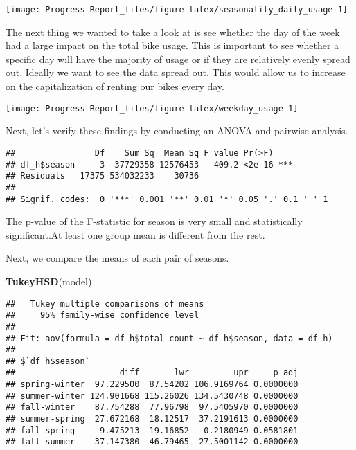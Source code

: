 \documentclass[
  11pt,
]{article}
\newenvironment{Shaded}{\begin{snugshade}}{\end{snugshade}}
\newcommand{\AttributeTok}[1]{\textcolor[rgb]{0.13,0.29,0.53}{#1}}
\newcommand{\FunctionTok}[1]{\textcolor[rgb]{0.13,0.29,0.53}{\textbf{#1}}}
\newcommand{\NormalTok}[1]{#1}
\newcommand{\OtherTok}[1]{\textcolor[rgb]{0.56,0.35,0.01}{#1}}
\newcommand{\SpecialCharTok}[1]{\textcolor[rgb]{0.81,0.36,0.00}{\textbf{#1}}}
\begin{document}
\begin{center}\texttt{[image: Progress-Report\_files/figure-latex/seasonality\_daily\_usage-1]} \end{center}

The next thing we wanted to take a look at is see whether the day of the
week had a large impact on the total bike usage. This is important to
see whether a specific day will have the majority of usage or if they
are relatively evenly spread out. Ideally we want to see the data spread
out. This would allow us to increase on the capitalization of renting
our bikes every day.

\begin{center}\texttt{[image: Progress-Report\_files/figure-latex/weekday\_usage-1]} \end{center}

Next, let's verify these findings by conducting an ANOVA and pairwise
analysis.

\begin{Shaded}
\end{Shaded}

\begin{verbatim}
##                Df    Sum Sq  Mean Sq F value Pr(>F)    
## df_h$season     3  37729358 12576453   409.2 <2e-16 ***
## Residuals   17375 534032233    30736                   
## ---
## Signif. codes:  0 '***' 0.001 '**' 0.01 '*' 0.05 '.' 0.1 ' ' 1
\end{verbatim}

The p-value of the F-statistic for season is very small and
statistically significant.At least one group mean is different from the
rest.

Next, we compare the means of each pair of seasons.

\begin{Shaded}
\begin{Highlighting}[]
\FunctionTok{TukeyHSD}\NormalTok{(model)}
\end{Highlighting}
\end{Shaded}

\begin{verbatim}
##   Tukey multiple comparisons of means
##     95% family-wise confidence level
## 
## Fit: aov(formula = df_h$total_count ~ df_h$season, data = df_h)
## 
## $`df_h$season`
##                     diff       lwr         upr     p adj
## spring-winter  97.229500  87.54202 106.9169764 0.0000000
## summer-winter 124.901668 115.26026 134.5430748 0.0000000
## fall-winter    87.754288  77.96798  97.5405970 0.0000000
## summer-spring  27.672168  18.12517  37.2191613 0.0000000
## fall-spring    -9.475213 -19.16852   0.2180949 0.0581801
## fall-summer   -37.147380 -46.79465 -27.5001142 0.0000000
\end{verbatim}
\end{document}
